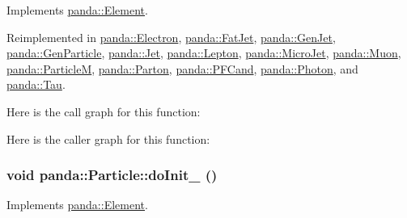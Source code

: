Implements \hyperlink{classpanda_1_1Element_aeac30a79f7ce156033a2dd7538fc919d}{panda::Element}.

Reimplemented in \hyperlink{classpanda_1_1Electron_a3e2097c55d5ab63188d0c04426e47248}{panda::Electron}, \hyperlink{classpanda_1_1FatJet_a96835f1d5e56985c033cc73029dccef0}{panda::FatJet}, \hyperlink{classpanda_1_1GenJet_a5f514a9289d97bd7b6b8731323143269}{panda::GenJet}, \hyperlink{classpanda_1_1GenParticle_a117dbbc192b9795838cbfbc75f0eceb8}{panda::GenParticle}, \hyperlink{classpanda_1_1Jet_a4ecbac39b42fe464f6346711aed38aba}{panda::Jet}, \hyperlink{classpanda_1_1Lepton_a90a170df4cd09d324964da724bcc5428}{panda::Lepton}, \hyperlink{classpanda_1_1MicroJet_a2055608524fe0bb8e4fae8ef78e3333e}{panda::MicroJet}, \hyperlink{classpanda_1_1Muon_af2331a81be13a07cc0202a6d107b0685}{panda::Muon}, \hyperlink{classpanda_1_1ParticleM_a003a63672058369e9bbea413e055b1c1}{panda::ParticleM}, \hyperlink{classpanda_1_1Parton_ab3709c6ae8b88560326291d4d1598c6b}{panda::Parton}, \hyperlink{classpanda_1_1PFCand_a3567f5259663a227698b6e27cc340cb4}{panda::PFCand}, \hyperlink{classpanda_1_1Photon_ae0b07f281f6553d7d1fe088374e6e39b}{panda::Photon}, and \hyperlink{classpanda_1_1Tau_ad81f7bd9caddfbc5773bd20f5f4a227f}{panda::Tau}.

Here is the call graph for this function:

Here is the caller graph for this function:\hypertarget{classpanda_1_1Particle_a3c8e5de4513c492b0bad74e5ba551775}{
\subsubsection[{doInit\_\-}]{\setlength{\rightskip}{0pt plus 5cm}void panda::Particle::doInit\_\- ()}}
\label{classpanda_1_1Particle_a3c8e5de4513c492b0bad74e5ba551775}


Implements \hyperlink{classpanda_1_1Element_a374af043de4cf724fb6f640644ec35dc}{panda::Element}.

